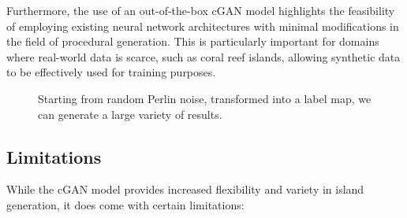 Furthermore, the use of an out-of-the-box cGAN model highlights the feasibility of employing existing neural network architectures with minimal modifications in the field of procedural generation. This is particularly important for domains where real-world data is scarce, such as coral reef islands, allowing synthetic data to be effectively used for training purposes.

\begin{figure}
    \caption{Starting from random Perlin noise, transformed into a label map, we can generate a large variety of results.}
    \label{fig:coral-island-perlin-examples}
\end{figure}

\subsection{Limitations}
\label{sec:coral-island-limitations}

While the cGAN model provides increased flexibility and variety in island generation, it does come with certain limitations:

